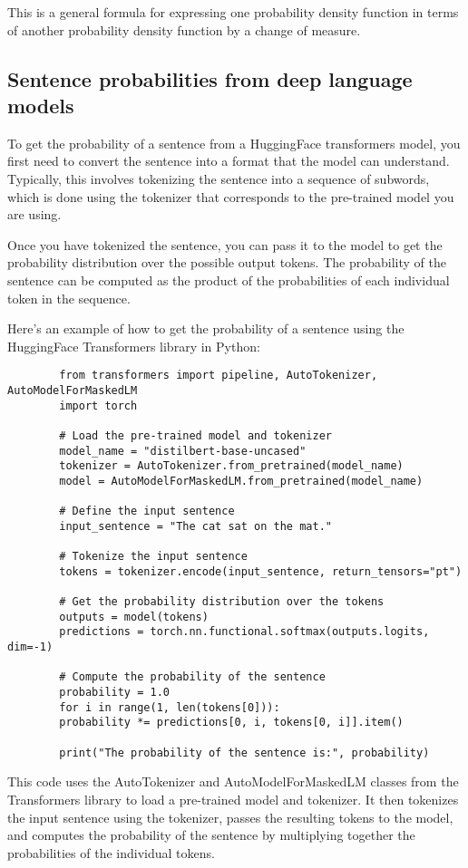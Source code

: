 \documentclass{article}
\begin{document}
	This is a general formula for expressing one probability density function in terms of another probability density function by a change of measure.
	
	\subsection{Sentence probabilities from deep language models}
	\label{sec:huggingface_sentence_probs}
	
	To get the probability of a sentence from a HuggingFace transformers model, you first need to convert the sentence into a format that the model can understand. Typically, this involves tokenizing the sentence into a sequence of subwords, which is done using the tokenizer that corresponds to the pre-trained model you are using.
	
	Once you have tokenized the sentence, you can pass it to the model to get the probability distribution over the possible output tokens. The probability of the sentence can be computed as the product of the probabilities of each individual token in the sequence.
	
	Here's an example of how to get the probability of a sentence using the HuggingFace Transformers library in Python:
	
	\begin{verbatim}
		from transformers import pipeline, AutoTokenizer, AutoModelForMaskedLM
		import torch
		
		# Load the pre-trained model and tokenizer
		model_name = "distilbert-base-uncased"
		tokenizer = AutoTokenizer.from_pretrained(model_name)
		model = AutoModelForMaskedLM.from_pretrained(model_name)
		
		# Define the input sentence
		input_sentence = "The cat sat on the mat."
		
		# Tokenize the input sentence
		tokens = tokenizer.encode(input_sentence, return_tensors="pt")
		
		# Get the probability distribution over the tokens
		outputs = model(tokens)
		predictions = torch.nn.functional.softmax(outputs.logits, dim=-1)
		
		# Compute the probability of the sentence
		probability = 1.0
		for i in range(1, len(tokens[0])):
		probability *= predictions[0, i, tokens[0, i]].item()
		
		print("The probability of the sentence is:", probability)
	\end{verbatim}
	
	This code uses the AutoTokenizer and AutoModelForMaskedLM classes from the Transformers library to load a pre-trained model and tokenizer. It then tokenizes the input sentence using the tokenizer, passes the resulting tokens to the model, and computes the probability of the sentence by multiplying together the probabilities of the individual tokens.
	
\end{document}
